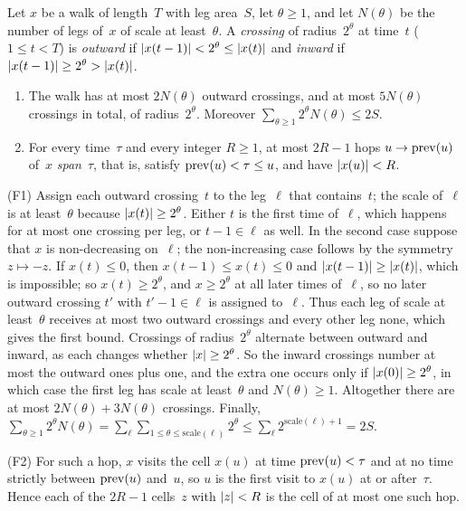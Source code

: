 \begin{lemma}\label{lem:dec-facts}
\notformalized
Let $x$ be a walk of length~$T$ with leg area~$S$, let $\theta\ge1$, and let $N(\theta)$ be the number of legs of~$x$
of scale at least~$\theta$. A \emph{crossing} of radius~$2^\theta$ at time~$t$ ($1\le t<T$) is \emph{outward} if
$\lvert x(t-1) \rvert<2^\theta\le\lvert x(t) \rvert$ and \emph{inward} if $\lvert x(t-1) \rvert\ge2^\theta>\lvert x(t) \rvert$.
\begin{enumerate}[label=\textup{(F\arabic*)}]
\item The walk has at most $2N(\theta)$ outward crossings, and at most $5N(\theta)$ crossings in total, of
radius~$2^\theta$. Moreover $\sum_{\theta\ge1}2^\theta N(\theta)\le2S$.
\item For every time~$\tau$ and every integer $R\ge1$, at most $2R-1$ hops $u\to\mathrm{prev}(u)$ of~$x$ \emph{span}~$\tau$,
that is, satisfy $\mathrm{prev}(u)<\tau\le u$, and have $\lvert x(u) \rvert<R$.
\end{enumerate}
\end{lemma}

\begin{informalproof}
(F1) Assign each outward crossing~$t$ to the leg~$\ell$ that contains~$t$; the scale of~$\ell$ is at least~$\theta$
because $\lvert x(t) \rvert\ge2^\theta$. Either $t$ is the first time of~$\ell$, which happens for at most one crossing per
leg, or $t-1\in\ell$ as well. In the second case suppose that $x$ is non-decreasing on~$\ell$; the non-increasing case
follows by the symmetry $z\mapsto-z$. If $x(t)\le0$, then $x(t-1)\le x(t)\le0$ and $\lvert x(t-1) \rvert\ge\lvert x(t) \rvert$,
which is impossible; so $x(t)\ge2^\theta$, and $x\ge2^\theta$ at all later times of~$\ell$, so no later outward
crossing $t'$ with $t'-1\in\ell$ is assigned to~$\ell$. Thus each leg of scale at least~$\theta$ receives at most two
outward crossings and every other leg none, which gives the first bound. Crossings of radius~$2^\theta$ alternate
between outward and inward, as each changes whether $\lvert x \rvert\ge2^\theta$. So the inward crossings number at most the
outward ones plus one, and the extra one occurs only if $\lvert x(0) \rvert\ge2^\theta$, in which case the first leg has
scale at least~$\theta$ and $N(\theta)\ge1$. Altogether there are at most $2N(\theta)+3N(\theta)$ crossings. Finally,
$\sum_{\theta\ge1}2^\theta N(\theta)=\sum_\ell\sum_{1\le\theta\le\mathrm{scale}(\ell)}2^\theta
\le\sum_\ell2^{\mathrm{scale}(\ell)+1}=2S$.

(F2) For such a hop, $x$ visits the cell $x(u)$ at time $\mathrm{prev}(u)<\tau$ and at no time strictly between $\mathrm{prev}(u)$
and~$u$, so $u$ is the first visit to $x(u)$ at or after~$\tau$. Hence each of the $2R-1$ cells~$z$ with $\lvert z \rvert<R$
is the cell of at most one such hop.
\end{informalproof}

